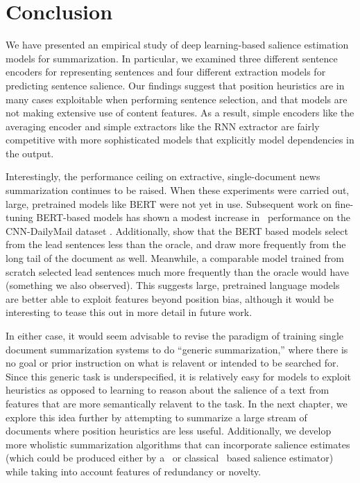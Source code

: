 \section{Conclusion}

We have presented an empirical study of deep learning-based salience estimation
models for summarization. In particular, we examined three different sentence
encoders for representing sentences and four different extraction models for
predicting sentence salience.  Our findings suggest that position heuristics
are in many cases  exploitable when performing sentence selection, and that
models are not making extensive use of content features. As a result, simple
encoders like the averaging encoder and simple extractors like the RNN
extractor are fairly competitive with more sophisticated models that explicitly
model dependencies in the output.

Interestingly, the performance ceiling on extractive, single-document news
summarization continues to be raised.  When these experiments were carried out,
large, pretrained models like BERT \citep{devlin2019} were not yet in use.
Subsequent work on fine-tuning BERT-based models has shown a modest increase in
\rouge~performance on the CNN-DailyMail dataset \citep{liu2019}.  Additionally,
\cite{liu2019} show that the BERT based models select from the lead sentences
less than the oracle, and draw more frequently from the long tail of the
document as well. Meanwhile, a comparable model trained from scratch selected
lead sentences much more frequently than the oracle would have (something we
also observed). This suggests large, pretrained language models are better able
to exploit features beyond position bias, although it would be interesting to
tease this out in more detail in future work.

In either case, it would seem advisable to revise the paradigm of training
single document summarization systems to do ``generic summarization,'' where
there is no goal or prior instruction on what is relavent or intended to be
searched for. Since this generic task is underspecified, it is relatively easy
for models to exploit heuristics as opposed to learning to reason about the
salience of a text from features that are more semantically relavent to the
task.  In the next chapter, we explore this idea further by attempting to
summarize a large stream of documents where position heuristics are less
useful.  Additionally, we develop more wholistic summarization algorithms that
can incorporate  salience estimates (which could be produced  either by a
\deeplearning~or classical \machinelearning~based salience estimator) while
taking into account features of redundancy or novelty. 
